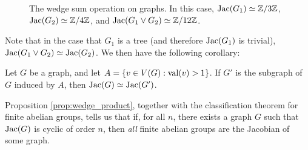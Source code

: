 \documentclass{amsart}
\begin{document}
\begin{figure}[h]
  \caption{The wedge sum operation on graphs. In this case, $\operatorname{Jac}(G_1)
  \simeq \mathbb{Z}/3\mathbb{Z}$, $\operatorname{Jac}(G_2) \simeq \mathbb{Z}/4\mathbb{Z}$, and $\operatorname{Jac}(G_1 \vee G_2)
  \simeq \mathbb{Z}/12\mathbb{Z}$.}
\end{figure}

Note that in the case that $G_1$ is a tree (and therefore $\operatorname{Jac}(G_1)$
is trivial), $\operatorname{Jac}(G_1 \vee G_2) \simeq \operatorname{Jac}(G_2)$. We then have
the following corollary:
\begin{cor}
  \label{cor:1_valent}
  Let $G$ be a graph, and let $A = \{v \in V(G) : \operatorname{val}(v) > 1\}$. If
  $G'$ is the subgraph of $G$ induced by $A$, then $\operatorname{Jac}(G) \simeq
  \operatorname{Jac}(G')$.
\end{cor}

Proposition \ref{prop:wedge_product}, together with the classification
theorem for finite abelian groups, tells us that if, for all $n$,
there exists a graph $G$ such that $\operatorname{Jac}(G)$ is cyclic of order $n$,
then \emph{all} finite abelian groups are the Jacobian of some graph.
\end{document}
